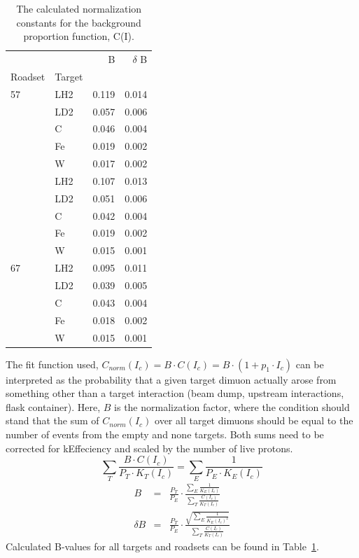 \begin{table}
	\centering
	\begin{tabular}{llrr}
		\toprule
		&             &  B &  $\delta$ B  \\
		Roadset & Target &                &       \\
		\midrule
		57 & LH2 &      0.119 &   0.014  \\
		&   LD2 &         0.057 &  0.006  \\
		& C &          0.046  &           0.004 \\
		& Fe &            0.019 &   0.002 \\
		& W &            0.017 &        0.002 \\ 
		\rowcol 62 & LH2 &      0.107 &   0.013  \\
		\rowcol &   LD2 &         0.051 &  0.006  \\
		\rowcol & C &          0.042 &           0.004 \\
		\rowcol & Fe &            0.019 &   0.002 \\
		\rowcol & W &            0.015 &        0.001 \\ 
		67 & LH2 &      0.095 &   0.011  \\
		&   LD2 &         0.039 &  0.005  \\
		& C &          0.043  &           0.004 \\
		& Fe &            0.018 &   0.002 \\
		& W &            0.015 &        0.001 \\ 
	\end{tabular}
	\caption{The calculated normalization constants for the background proportion function, C(I).}
	\label{tab:bg-b-vals}
\end{table}
The fit function used, $C_{norm}(I_c) = B \cdot C(I_c) = B \cdot (1 + p_1 \cdot I_c)$  can be interpreted as the probability that a given target dimuon actually arose from something other than a target interaction (beam dump, upstream interactions, flask container). Here, $B$ is the normalization factor, where the condition should stand that the sum of $C_{norm}(I_c)$ over all target dimuons should be equal to the number of events from the empty and none targets. Both sums need to be corrected for kEffeciency and scaled by the number of live protons.
\begin{equation}
\sum\limits_T \frac{B \cdot C(I_c)}{P_T \cdot K_T(I_c)} = \sum\limits_E \frac{1}{P_E \cdot K_E(I_c)}
\end{equation}
\begin{eqnarray}
B & = & \frac{P_T}{P_E} \cdot \frac{\sum\limits_E \frac{1}{K_E(I_c)}}{\sum\limits_T \frac{C(I_c)}{K_T(I_c)}} \\
\delta B & = & \frac{P_T}{P_E} \cdot \frac{\sqrt{\sum\limits_E \frac{1}{K_E(I_c)^2}}}{\sum\limits_T \frac{C(I_c)}{K_T(I_c)}}
\end{eqnarray}
Calculated B-values for all targets and roadsets can be found in Table~\ref{tab:bg-b-vals}.

